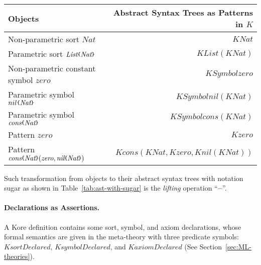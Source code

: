 \documentclass[UTF8,11pt]{article}
\theoremstyle{plain}
\theoremstyle{definition}
\theoremstyle{remark}
\newcommand{\Nat}{\textit{Nat}}
\newcommand{\KNat}{\textit{KNat}}
\newcommand{\List}{\textit{List}}
\newcommand{\KList}{\textit{KList}}
\newcommand{\nil}{\textit{nil}}
\newcommand{\cons}{\textit{cons}}
\newcommand{\parametric}[2]{{#1}\raisebox{.2ex}{\texttt{\footnotesize{\{}}}#2\raisebox{.2ex}{\texttt{\footnotesize{\}}}}}
\newcommand{\zero}{\textit{zero}}
\newcommand{\Kzero}{\textit{Kzero}}
\newcommand{\Kcons}{\mathit{Kcons}}
\newcommand{\Knil}{\mathit{Knil}}
\newcommand{\KSymbolzero}{\mathit{KSymbolzero}}
\newcommand{\KSymbolcons}{\mathit{KSymbolcons}}
\newcommand{\KSymbolnil}{\mathit{KSymbolnil}}
\newcommand{\KsortDeclared}{\mathit{KsortDeclared}}
\newcommand{\KsymbolDeclared}{\mathit{KsymbolDeclared}}
\newcommand{\KaxiomDeclared}{\mathit{KaxiomDeclared}}
\begin{document}
\begin{center}
	\begin{tabular}{l|r}
		\textbf{Objects} & \textbf{Abstract Syntax Trees as Patterns in $K$}
		\\\hline
		Non-parametric sort $\Nat$ & $\KNat$
		\\\hline
		Parametric sort $\parametric{\List}{\Nat}$ & $\KList(\KNat)$
		\\\hline
		Non-parametric constant symbol $\zero$ & $\KSymbolzero$
		\\\hline
		Parametric symbol $\parametric{nil}{\Nat}$ & $\KSymbolnil(\KNat)$
		\\\hline
		Parametric symbol $\parametric{\cons}{\Nat}$ & $\KSymbolcons(\KNat)$
		\\\hline
		Pattern $zero$ & $\Kzero$
		\\\hline
		Pattern $\parametric{\cons}{\Nat}(\zero, \parametric{\nil}{\Nat})$
		& $\Kcons(\KNat, \Kzero, \Knil(\KNat))$
	\end{tabular}
	\label{tab:ast-with-sugar}
\end{center}

Such transformation from objects to their abstract syntax trees with notation sugar as shown in Table~\ref{tab:ast-with-sugar} is the \emph{lifting} operation ``$\widehat{\ \ \ }$''.

\paragraph{Declarations as Assertions.}

A Kore definition contains some sort, symbol, and axiom declarations, whose formal semantics are given in the meta-theory with three predicate symbols: $\KsortDeclared$, $\KsymbolDeclared$, and $\KaxiomDeclared$ (See Section~\cref{sec:ML-theories}).
\end{document}
